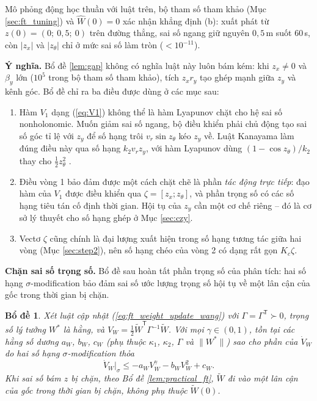 \documentclass[12pt,a4paper]{article}
\newtheorem{bode}{Bổ đề}
\newcommand{\T}{\mathsf{T}}
\begin{document}
Mô phỏng động học thuần với luật trên, bộ tham số tham khảo (Mục \ref{sec:ft_tuning}) và $\hat W(0) = 0$ xác nhận khẳng định (b): xuất phát từ $z(0) = (0;\ 0{,}5;\ 0)$ trên đường thẳng, sai số ngang giữ nguyên $0{,}5$\,m suốt 60\,s, còn $|z_x|$ và $|z_\theta|$ chỉ ở mức sai số làm tròn ($< 10^{-11}$).

\textbf{Ý nghĩa.} Bổ đề \ref{lem:gap} không có nghĩa luật này luôn bám kém: khi $z_x \neq 0$ và $\beta_y$ lớn ($10^5$ trong bộ tham số tham khảo), tích $z_x r_y$ tạo ghép mạnh giữa $z_y$ và kênh góc. Bổ đề chỉ ra ba điều được dùng ở các mục sau:
\begin{enumerate}
    \item Hàm $V_1$ dạng (\ref{eq:V1}) không thể là hàm Lyapunov chặt cho hệ sai số nonholonomic. Muốn giảm sai số ngang, bộ điều khiển phải chủ động tạo sai số góc tỉ lệ với $z_y$ để số hạng trôi $v_r\sin z_\theta$ kéo $z_y$ về. Luật Kanayama làm đúng điều này qua số hạng $k_2 v_r z_y$, với hàm Lyapunov dùng $(1-\cos z_\theta)/k_2$ thay cho $\frac12 z_\theta^2$ \cite{Kanayama1990}.
    \item Điều vòng 1 bảo đảm được một cách chặt chẽ là phần \textit{tác động trực tiếp}: đạo hàm của $V_1$ được điều khiển qua $\zeta = [z_x; z_\theta]$, và phần trọng số có các số hạng tiêu tán cố định thời gian. Hội tụ của $z_y$ cần một cơ chế riêng -- đó là cơ sở lý thuyết cho số hạng ghép ở Mục \ref{sec:czy}.
    \item Vectơ $\zeta$ cũng chính là đại lượng xuất hiện trong số hạng tương tác giữa hai vòng (Mục \ref{sec:step2}), nên số hạng chéo của vòng 2 có dạng rất gọn $K_c\zeta$.
\end{enumerate}

\textbf{Chặn sai số trọng số.} Bổ đề sau hoàn tất phần trọng số của phân tích: hai số hạng $\sigma$-modification bảo đảm sai số ước lượng trọng số hội tụ về một lân cận của gốc trong thời gian bị chặn.

\begin{bode}\label{lem:weight}
Xét luật cập nhật (\ref{eq:ft_weight_update_wang}) với $\Gamma = \Gamma^\T \succ 0$, trọng số lý tưởng $W^*$ là hằng, và $V_W = \frac12\tilde W^\T\Gamma^{-1}\tilde W$. Với mọi $\gamma \in (0, 1)$, tồn tại các hằng số dương $a_W$, $b_W$, $c_W$ (phụ thuộc $\kappa_1$, $\kappa_2$, $\Gamma$ và $\|W^*\|$) sao cho phần của $\dot V_W$ do hai số hạng $\sigma$-modification thỏa
\begin{equation}\label{eq:weight_bound}
    \dot V_W\big|_\sigma \leq -a_W V_W^{\gamma} - b_W V_W^2 + c_W .
\end{equation}
Khi sai số bám $z$ bị chặn, theo Bổ đề \ref{lem:practical_ft}, $\tilde W$ đi vào một lân cận của gốc trong thời gian bị chặn, không phụ thuộc $\tilde W(0)$.
\end{bode}
\end{document}

